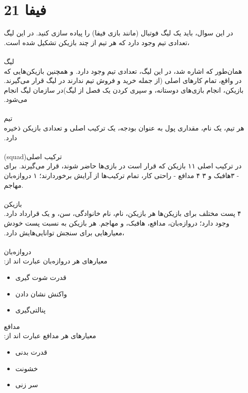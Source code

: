 \documentclass[]{article}
\begin{document}
\section{فیفا 21}
در اﯾﻦ ﺳﻮال‪ ،‬ﺑﺎﯾﺪ ﯾﮏ ﻟﯿﮓ ﻓﻮﺗﺒﺎل (ﻣﺎﻧﻨﺪ ﺑﺎزی ﻓﯿﻔﺎ) را ﭘﯿﺎده ﺳﺎزی ﮐﻨﯿﺪ‪ .‬در اﯾﻦ ﻟﯿﮓ‪ ،‬ﺗﻌﺪادی ﺗﯿﻢ وﺟﻮد دارد ﮐﻪ ﻫﺮ ﺗﯿﻢ از‬ ‫ﭼﻨﺪ ﺑﺎزﯾﮑﻦ ﺗﺸﮑﯿﻞ ﺷﺪه اﺳﺖ‪.‬‬
\\\\
ﻟﯿﮓ‬
\\
‫ﻫﻤﺎنﻃﻮر ﮐﻪ اﺷﺎره ﺷﺪ‪ ،‬در اﯾﻦ ﻟﯿﮓ‪ ،‬ﺗﻌﺪادی ﺗﯿﻢ وﺟﻮد دارد‪ .‬و ﻫﻤﭽﻨﯿﻦ ﺑﺎزﯾﮑﻦﻫﺎﯾﯽ ﮐﻪ ﺗﯿﻢ ﻧﺪارﻧﺪ در ﻟﯿﮓ ﻗﺮار ﻣﯽﮔﯿﺮﻧﺪ‪.‬‬ ‫در واﻗﻊ‪ ،‬ﺗﻤﺎم ﮐﺎرﻫﺎی اﺻﻠﯽ (از ﺟﻤﻠﻪ ﺧﺮﯾﺪ و ﻓﺮوش ﺑﺎزﯾﮑﻦ‪ ،‬اﻧﺠﺎم ﺑﺎزیﻫﺎی دوﺳﺘﺎﻧﻪ‪ ،‬و ﺳﭙﺮی ﮐﺮدن ﯾﮏ ﻓﺼﻞ از ﻟﯿﮓ)در ‫ﺳﺎزﻣﺎن ﻟﯿﮓ اﻧﺠﺎم ﻣﯽﺷﻮد.
\\\\
تیم
\\
‫ﻫﺮ ﺗﯿﻢ‪ ،‬ﯾﮏ ﻧﺎم‪ ،‬ﻣﻘﺪاری ﭘﻮل ﺑﻪ ﻋﻨﻮان ﺑﻮدﺟﻪ‪ ،‬ﯾﮏ ﺗﺮﮐﯿﺐ اﺻﻠﯽ و ﺗﻌﺪادی ﺑﺎزﯾﮑﻦ ذﺧﯿﺮه دارد‪.‬‬
\\\\
‫ﺗﺮﮐﯿﺐ اﺻﻠﯽ(squad)
\\
در ترکیب اصلی ۱۱ بازیکن که قرار است در ﺑﺎزیﻫﺎ ﺣﺎﺿﺮ ﺷﻮﻧﺪ‪ ،‬ﻗﺮار ﻣﯽﮔﯿﺮﻧﺪ‪ .‬ﺑﺮای راحتی کار، تمام ترکیب‌ها از آرایش  برخوردارند؛  ۱‬ دروازهﺑﺎن - ‪ ۴‬ﻣﺪاﻓﻊ ‪ ۳ -‬ﻫﺎﻓﺒﮏ و ۳ مهاجم.
\\\\
ﺑﺎزﯾﮑﻦ
\\
ﻫﺮ ﺑﺎزﯾﮑﻦ‪ ،‬ﻧﺎم‪ ،‬ﻧﺎم ﺧﺎﻧﻮادﮔﯽ‪ ،‬ﺳﻦ‪ ،‬و ﯾﮏ ﻗﺮارداد دارد‪.‬‬
‫‪ ۴‬ﭘﺴﺖ ﻣﺨﺘﻠﻒ ﺑﺮای ﺑﺎزﯾﮑﻦﻫﺎ وﺟﻮد دارد؛ دروازهﺑﺎن‪ ،‬ﻣﺪاﻓﻊ‪ ،‬ﻫﺎﻓﺒﮏ‪ ،‬و ﻣﻬﺎﺟﻢ‪ .‬ﻫﺮ ﺑﺎزﯾﮑﻦ ﺑﻪ ﻧﺴﺒﺖ ﭘﺴﺖ ﺧﻮدش‪ ،‬ﻣﻌﯿﺎرﻫﺎﯾﯽ‬
‫ﺑﺮای ﺳﻨﺠﺶ ﺗﻮاﻧﺎﯾﯽﻫﺎﯾﺶ دارد‪.‬‬
\\\\
‫دروازهﺑﺎن‬
\\
ﻣﻌﯿﺎرﻫﺎی ﻫﺮ دروازهﺑﺎن ﻋﺒﺎرت اﻧﺪ از‪:‬‬
\\
\begin{itemize}
	\item
	ﻗﺪرت ﺷﻮت ﮔﯿﺮی  
	\item
	واﮐﻨﺶ ﻧﺸﺎن دادن ‬‬
	\item
	ﭘﻨﺎﻟﺘﯽﮔﯿﺮی ‬‬‫‬
\end{itemize}
مدافع
\\
ﻣﻌﯿﺎرﻫﺎی ﻫﺮ مدافع ﻋﺒﺎرت اﻧﺪ از‪:‬‬
\begin{itemize}
	\item
	‫ ﻗﺪرت ﺑﺪﻧﯽ  
	\item
	ﺧﺸﻮﻧﺖ ‬‬‫ 
	\item
	ﺳﺮ زﻧﯽ ‬‬‫
\end{itemize}
\end{document}
